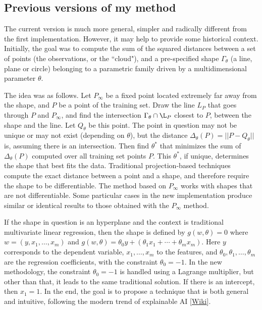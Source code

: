\documentclass[oneside,10pt]{book}
\begin{document}
\subsection{Previous versions of my method}\label{prevmeth}\label{mapmp}

The current version is much more general, simpler and radically different from the first implementation. However, it may help to provide
 some historical context. Initially, the goal was to compute the sum of the squared distances between a set of points (the observations, or the ``cloud"), and
 a pre-specified shape $\Gamma_\theta$ (a line, plane or circle) belonging to a parametric family driven by a multidimensional parameter $\theta$.

The idea was as follows. Let $P_\infty$ be a fixed point located extremely far away from the shape, and $P$ be a point of the \textcolor{index}{training set}. Draw the line
 $L_P$ that goes through $P$ and $P_\infty$, and find the intersection $\Gamma_\theta \cap \L_P$ closest to $P$, between the shape and the line. Let $Q_\theta$ be this point. The point in question may not be unique or may not exist (depending on $\theta$), but the distance $\Delta_\theta(P)=||P-Q_\theta||$ is, assuming there is an intersection. Then find $\theta^*$ that
minimizes the sum of $\Delta_\theta(P)$ computed over all training set points $P$. This $\theta^*$, if unique, determines the shape that best fits the data. Traditional projection-based techniques compute the exact distance between a point and a shape, and therefore require the shape to be differentiable. The method based on
 $P_\infty$ works with shapes that are not differentiable. Some particular cases in the new implementation produce similar or identical results to those obtained with the $P_\infty$ method.

If the shape in question is an hyperplane and the context is traditional multivariate linear regression, then the shape is defined by
$g(w,\theta)=0$ where $w=(y,x_1,\dots,x_m)$ and $g(w,\theta)=\theta_0 y+(\theta_1 x_1+\cdots +\theta_m x_m)$. Here $y$ corresponds to the dependent variable, $x_1,\dots, x_m$ to the features, and $\theta_0, \theta_1,\dots,\theta_m$ are the regression coefficients, with the constraint
$\theta_0=-1$. In the new methodology, the constraint $\theta_0=-1$ is handled using a Lagrange multiplier, but other than that, it leads to the same traditional solution. If there is an intercept, then $x_1=1$. In the end, the goal is to propose a technique that is both general and intuitive,
 following the modern trend of \textcolor{index}{explainable AI} [\href{https://en.wikipedia.org/wiki/Explainable_artificial_intelligence}{Wiki}].
\end{document}
